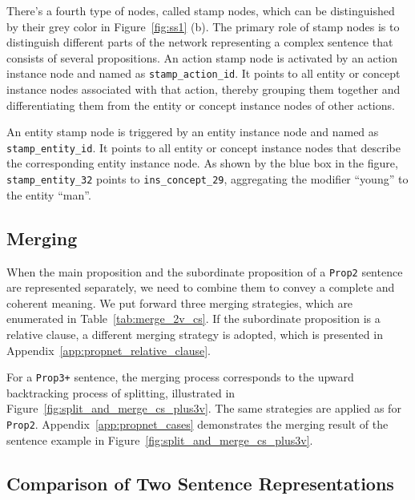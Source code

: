 There's a fourth type of nodes, called stamp nodes, which can be distinguished by their grey color in Figure~\ref{fig:ss1} (b). The primary role of stamp nodes is to distinguish different parts of the network representing a complex sentence that consists of several propositions. An action stamp node is activated by an action instance node and named as \texttt{stamp\_action\_id}. It points to all entity or concept instance nodes associated with that action, thereby grouping them together and differentiating them from the entity or concept instance nodes of other actions. 

An entity stamp node is triggered by an entity instance node and named as \texttt{stamp\_entity\_id}. It points to all entity or concept instance nodes that describe the corresponding entity instance node. As shown by the blue box in the figure, \texttt{stamp\_entity\_32} points to \texttt{ins\_concept\_29}, aggregating the modifier ``young'' to the entity ``man''. 





\subsection{Merging}

When the main proposition and the subordinate proposition of a \texttt{Prop2} sentence are represented separately, we need to combine them to convey a complete and coherent meaning. We put forward three merging strategies, which are enumerated in Table~\ref{tab:merge_2v_cs}. If the subordinate proposition is a relative clause, a different merging strategy is adopted, which is presented in Appendix~\ref{app:propnet_relative_clause}. 

For a \texttt{Prop3+} sentence, the merging process corresponds to the upward backtracking process of splitting, illustrated in Figure~\ref{fig:split_and_merge_cs_plus3v}. The same strategies are applied as for \texttt{Prop2}. Appendix~\ref{app:propnet_cases} demonstrates the merging result of the sentence example in Figure~\ref{fig:split_and_merge_cs_plus3v}.



\subsection{Comparison of Two Sentence Representations}
\label{sec: diff_vec}


